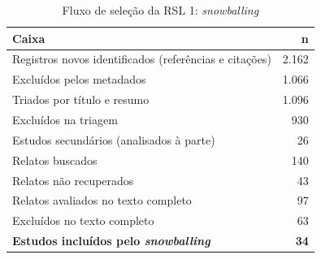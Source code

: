 \begin{table}[htbp]
\centering
\caption{Fluxo de seleção da RSL 1: \textit{snowballing}}
\label{tab:snowball-rsl1}
\small
\begin{tabular}{p{11.7cm}r}
\hline
\textbf{Caixa} & \textbf{n} \\
\hline
Registros novos identificados (referências e citações) & 2.162 \\
Excluídos pelos metadados & 1.066 \\
Triados por título e resumo & 1.096 \\
Excluídos na triagem & 930 \\
Estudos secundários (analisados à parte) & 26 \\
Relatos buscados & 140 \\
Relatos não recuperados & 43 \\
Relatos avaliados no texto completo & 97 \\
Excluídos no texto completo & 63 \\
\textbf{Estudos incluídos pelo \textit{snowballing}} & \textbf{34} \\
\hline
\end{tabular}
\end{table}
